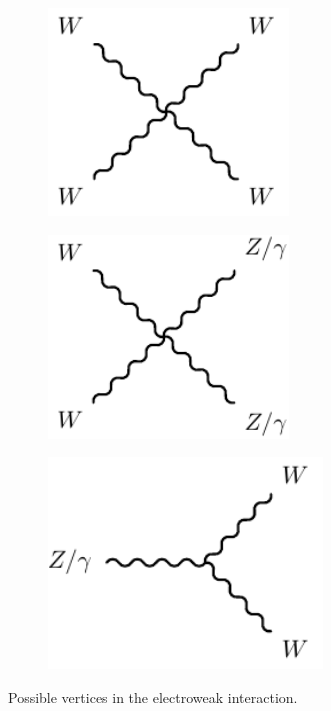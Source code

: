 \begin{figure}
\begin{subfigure}[b]{0.33\linewidth}
	\end{subfigure}
	\par\medskip
	\begin{subfigure}[b]{0.33\linewidth}
		\centering\includegraphics[width=0.7\textwidth]{w_boson_quartic_vertex}
	\end{subfigure}%
	\begin{subfigure}[b]{0.33\linewidth}
		\centering\includegraphics[width=0.7\textwidth]{wz_boson_quartic_vertex}
	\end{subfigure}	
	\begin{subfigure}[b]{0.33\linewidth}
		\centering\includegraphics[width=0.8\textwidth]{w_boson_cubic_vertex}
	\end{subfigure}
	\caption{Possible vertices in the electroweak interaction.}
	\label{fig:ewk_vertices}
\end{figure}


